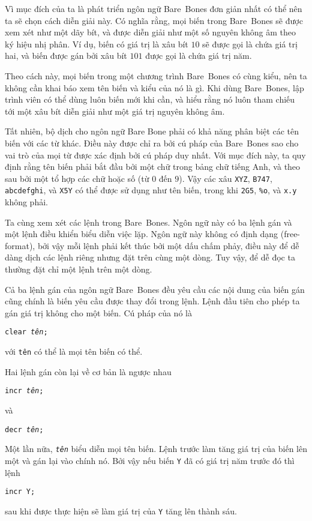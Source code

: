 Vì mục đích của ta là phát triển ngôn ngữ Bare~Bones đơn giản nhất có thể nên ta sẽ chọn
cách diễn giải này. Có nghĩa rằng, mọi biến trong Bare~Bones sẽ được xem xét như một dãy
bít, và được diễn giải như một số nguyên không âm theo ký hiệu nhị phân. Ví dụ, biến có
giá trị là xâu bít $10$ sẽ được gọi là chứa giá trị hai, và biến được gán bởi xâu bít
$101$ được gọi là chứa giá trị năm.

Theo cách này, mọi biến trong một chương trình Bare~Bones có cùng kiểu, nên ta không cần
khai báo xem tên biến và kiểu của nó là gì. Khi dùng Bare~Bones, lập trình viên có thể
dùng luôn biến mới khi cần, và hiểu rằng nó luôn tham chiếu tới một xâu bít diễn giải như
một giá trị nguyên không âm.

Tất nhiên, bộ dịch cho ngôn ngữ Bare Bone phải có khả năng phân biệt các tên biến với các
từ khác. Điều này được chỉ ra bởi cú pháp của Bare~Bones sao cho vai trò của mọi từ được
xác định bởi cú pháp duy nhất. Với mục đích này, ta quy định rằng tên biến phải bắt đầu
bởi một chữ trong bảng chữ tiếng Anh, và theo sau bởi một tổ hợp các chữ hoặc số (từ $0$
đến $9$). Vậy các xâu \texttt{XYZ}, \texttt{B747}, \texttt{abcdefghi}, và \texttt{X5Y} có
thể được sử dụng như tên biến, trong khi \texttt{2G5}, \texttt{\%o}, và \texttt{x.y} không
phải.

Ta cùng xem xét các lệnh trong Bare~Bones. Ngôn ngữ này có ba lệnh gán và một lệnh điều
khiển biểu diễn việc lặp. Ngôn ngữ này không có định dạng (free-format), bởi vậy mỗi lệnh
phải kết thúc bởi một dấu chấm phảy, điều này để dễ dàng dịch các lệnh riêng nhưng đặt
trên cùng một dòng. Tuy vậy, để dễ đọc ta thường đặt chỉ một lệnh trên một dòng.

Cả ba lệnh gán của ngôn ngữ Bare~Bones đều yêu cầu các nội dung của biến gán cũng chính là
biến yêu cầu được thay đổi trong lệnh. Lệnh đầu tiên cho phép ta gán giá trị không cho một
biến. Cú pháp của nó là
\begin{flushleft}
 \qquad \qquad \qquad \texttt{clear \textit{tên};}
\end{flushleft}
với \texttt{tên} có thể là mọi tên biến có thể.

Hai lệnh gán còn lại về cơ bản là ngược nhau
\begin{flushleft}
  \qquad\qquad\qquad\texttt{incr \textit{tên};}
\end{flushleft}
và
\begin{flushleft}
 \qquad\qquad\qquad \texttt{decr \textit{tên};}
\end{flushleft}
Một lần nữa, \texttt{\it tên} biểu diễn mọi tên biến. Lệnh trước làm tăng giá trị của biến
lên một và gán lại vào chính nó. Bởi vậy nếu biến \texttt{Y} đã có giá trị năm trước đó
thì lệnh
\begin{flushleft}
 \qquad\qquad\qquad \texttt{incr Y;}
\end{flushleft}
sau khi được thực hiện sẽ làm giá trị của \texttt{Y} tăng lên thành sáu.

